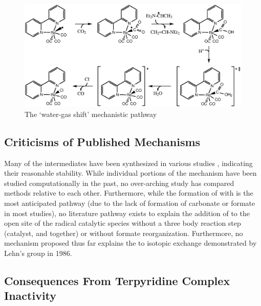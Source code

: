 \begin{figure}[!htb]
 \begin{center}
  \includegraphics[clip=true, width=\textwidth, keepaspectratio]{images/watergas.eps}
 \end{center}
\caption{The `water-gas shift' mechanistic pathway}
\label{fig.watergas}
\end{figure} 

\subsection{Criticisms of Published Mechanisms}

Many of the intermediates have been synthesized in various studies , indicating their reasonable stability. While individual portions of the mechanism have been studied computationally in the past, no over-arching study has compared methods relative to each other. Furthermore, while the formation of  with  is the most anticipated pathway (due to the lack of formation of carbonate or formate in most studies), no literature pathway exists to explain the addition of  to the open site of the radical catalytic species without a three body reaction step (catalyst,  and  together) or without formate reorganization. Furthermore, no mechanism proposed thus far explains the  to  isotopic exchange demonstrated by Lehn's group in 1986\autocite{hawecker1986}. 

\subsection{Consequences From \texorpdfstring{}{Bidentate} Terpyridine Complex Inactivity}

